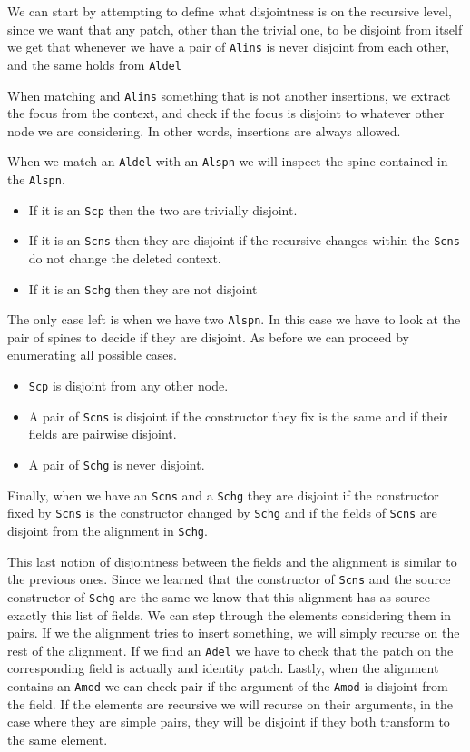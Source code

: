 \documentclass[11pt, titlepage]{article}
\newcommand{\toHaskell}[1]{\texttt{#1}\xspace}
\newcommand{\alins}{\toHaskell{Alins}}
\newcommand{\aldel}{\toHaskell{Aldel}}
\newcommand{\alspn}{\toHaskell{Alspn}}
\newcommand{\scp}{\toHaskell{Scp}}
\newcommand{\scns}{\toHaskell{Scns}}
\newcommand{\schg}{\toHaskell{Schg}}
\newcommand{\adel}{\toHaskell{Adel}}
\newcommand{\amod}{\toHaskell{Amod}}
\begin{document}
We can start by attempting to define what disjointness is on the recursive 
level, since we want that any patch, other than the trivial one, to be disjoint 
from itself we get that whenever we have a pair of \alins is never disjoint from 
each other, and the same holds from \aldel

When matching and \alins something that is not another insertions, we extract 
the focus from the context, and check if the focus is disjoint to whatever other 
node we are considering. In other words, insertions are always allowed.

When we match an \aldel with an \alspn we 
will inspect the spine contained in the \alspn.
\begin{itemize}
\item If it is an \scp then the two are trivially disjoint.

\item If it is an \scns then they are disjoint if the recursive changes within the \scns do not change the deleted context.

\item If it is an \schg then they are not disjoint

\end{itemize}

The only case left is when we have two \alspn. In this case we have to look at 
the pair of spines to decide if they are disjoint. As before we can proceed by 
enumerating all possible cases.

\begin{itemize}
\item \scp is disjoint from any other node. 

\item A pair of \scns is disjoint if the constructor they fix is the same and if their 
fields are pairwise disjoint.

\item A pair of \schg is never disjoint.
\end{itemize}


Finally, when we have an \scns and a \schg they are disjoint if the constructor 
fixed by \scns is the constructor changed by \schg and if the fields of \scns 
are disjoint from the alignment in \schg.


This last notion of disjointness between the fields and the alignment is similar to the previous ones.
Since we learned that the constructor of \scns and the source constructor of 
\schg are the same we know that this alignment has as source exactly this list 
of fields. We can step through the elements considering them in pairs. 
If we the 
alignment tries to insert something, we will simply recurse on the rest of the 
alignment. 
If we find an \adel we have to check that the patch on the corresponding field 
is actually and identity patch. 
Lastly, when the alignment contains an \amod we can check pair if the argument 
of the \amod is disjoint from the field. 
If the elements are recursive we will recurse on their arguments, in the case 
where they are simple pairs, they will be disjoint if they both transform to the 
same element.
\end{document}
